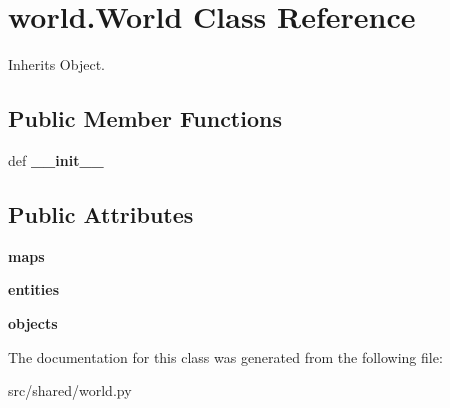 \hypertarget{classworld_1_1_world}{\section{world.\-World \-Class \-Reference}
\label{classworld_1_1_world}
}


\-Inherits \-Object.

\subsection*{\-Public \-Member \-Functions}
\begin{DoxyCompactItemize}
\item 
\hypertarget{classworld_1_1_world_a4351253668240be9d3a0d5bc2f1aa18f}{def {\bfseries \-\_\-\-\_\-init\-\_\-\-\_\-}}\label{classworld_1_1_world_a4351253668240be9d3a0d5bc2f1aa18f}

\end{DoxyCompactItemize}
\subsection*{\-Public \-Attributes}
\begin{DoxyCompactItemize}
\item 
\hypertarget{classworld_1_1_world_ae5d81046b959889536deca60b2df94a4}{{\bfseries maps}}\label{classworld_1_1_world_ae5d81046b959889536deca60b2df94a4}

\item 
\hypertarget{classworld_1_1_world_ae2c39feccf4fcd06f11f8398e42505a4}{{\bfseries entities}}\label{classworld_1_1_world_ae2c39feccf4fcd06f11f8398e42505a4}

\item 
\hypertarget{classworld_1_1_world_a144e6d2a815857b12be4cd2bf4ac2c44}{{\bfseries objects}}\label{classworld_1_1_world_a144e6d2a815857b12be4cd2bf4ac2c44}

\end{DoxyCompactItemize}


\-The documentation for this class was generated from the following file\-:\begin{DoxyCompactItemize}
\item 
src/shared/world.\-py\end{DoxyCompactItemize}
